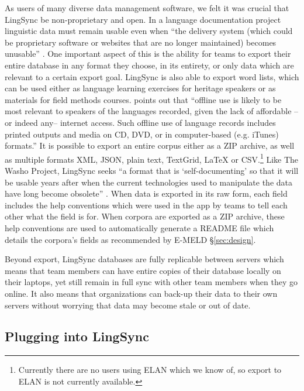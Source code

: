\documentclass[letterpaper, 12pt, dvips]{mitwpl}
\begin{document}
As users of many diverse data management software,
we felt it was crucial that LingSync be non-proprietary and open. In a language documentation project linguistic data must remain usable even when ``the delivery system (which could be proprietary software or websites that are no longer maintained) becomes unusable'' \citep[p.132]{Thieberger:2012}.
One important aspect of this is the ability for teams to export their entire database in any format they choose,
in its entirety, or only data which are relevant to a certain export goal.
LingSync is also able to export word lists,
which can be used either as language learning exercises for heritage speakers or as materials for field methods courses.
\cite{Thieberger:2012} points out that ``offline use is likely to be most relevant to speakers of the languages recorded, given the lack of affordable -- or indeed any-- internet access. Such offline use of language records includes printed outputs and media on CD, DVD, or in computer-based (e.g. iTunes) formats.'' 
It is possible to export an entire corpus either as a ZIP archive,
as well as multiple formats XML, JSON, plain text, TextGrid, LaTeX  or CSV.\footnote{Currently there are no users using ELAN which we know of, so export to ELAN is not currently available.} Like The Washo Project, LingSync seeks ``a format that is `self-documenting' so that it will be usable years after when the current technologies used to manipulate the data have long become obsolete'' \citep[p.4]{Cihlar:2008}. When data is exported in its raw form, each field includes the help conventions which were used in the app by teams to tell each other what the field is for. When corpora are exported as a ZIP archive, these help conventions are used to automatically generate a README file which details the corpora's fields as recommended by E-MELD \S \ref{sec:design}.

Beyond export,
LingSync databases are fully replicable between servers 
which means that team members can have entire copies of their database locally on their laptops,
yet still remain in full sync with other team members when they go online.
It also means that organizations can back-up their data to their own servers without worrying that data may become stale or out of date.




\subsection{Plugging into LingSync}
\label{sec:plugins}
\end{document}
